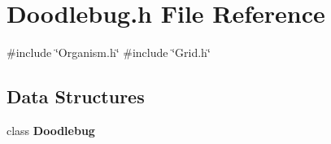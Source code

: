 \section{Doodlebug.\+h File Reference}
\label{Doodlebug_8h}
{\ttfamily \#include \char`\"{}Organism.\+h\char`\"{}}\newline
{\ttfamily \#include \char`\"{}Grid.\+h\char`\"{}}\newline
\subsection*{Data Structures}
\begin{DoxyCompactItemize}
\item 
class \textbf{ Doodlebug}
\end{DoxyCompactItemize}
